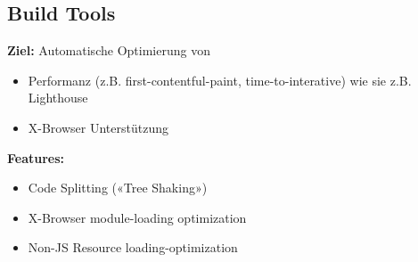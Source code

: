 \subsection{Build Tools}
\textbf{Ziel:} Automatische Optimierung von
\begin{itemize}
    \item Performanz (z.B. first-contentful-paint, time-to-interative) wie sie z.B. Lighthouse
    \item X-Browser Unterstützung
\end{itemize}
\textbf{Features:}
\begin{itemize}
    \item Code Splitting («Tree Shaking»)
    \item X-Browser module-loading optimization
    \item Non-JS Resource loading-optimization
\end{itemize}

\vfill